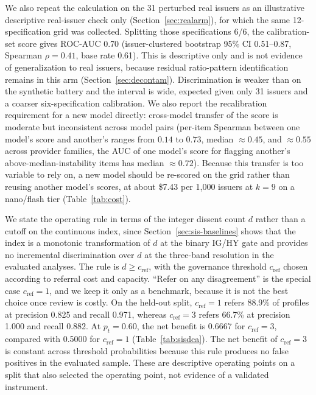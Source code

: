 \documentclass[a4paper,fleqn]{cas-sc}
\begin{document}
We also repeat the calculation on the 31 perturbed real issuers as an illustrative descriptive real-issuer check only (Section~\ref{sec:realarm}), for which the same 12-specification
grid was collected. Splitting those specifications 6/6, the calibration-set score gives ROC-AUC 0.70 (issuer-clustered bootstrap 95\% CI 0.51--0.87, Spearman $\rho=0.41$, base rate 0.61). This is descriptive only and is not evidence of generalization to real issuers, because residual ratio-pattern identification remains in this arm (Section~\ref{sec:decontam}). Discrimination is weaker than on the synthetic battery
and the interval is wide, expected given only 31 issuers and a coarser six-specification
calibration. 
 We also
report the recalibration requirement for a new model directly: cross-model transfer of the score is
moderate but inconsistent across model pairs (per-item Spearman between one model's score and another's
ranges from $0.14$ to $0.73$, median $\approx0.45$, and $\approx0.55$ across provider families, the AUC of
one model's score for flagging another's above-median-instability items has median $\approx0.72$). Because
this transfer is too variable to rely on, a new model should be re-scored on the grid rather than reusing
another model's scores, at about \$7.43 per 1{,}000 issuers at $k=9$ on a
nano/flash tier (Table~\ref{tab:cost}).

We state the operating rule in terms of the integer dissent count $d$ rather than a cutoff on the
continuous index, since Section~\ref{sec:sis-baselines} shows that the index is a monotonic transformation of $d$ at the binary IG/HY gate and provides no incremental discrimination over $d$ at the three-band resolution in the evaluated analyses. The rule is $d\ge c_{\mathrm{ref}}$, with the governance threshold $c_{\mathrm{ref}}$ chosen
according to referral cost and capacity. ``Refer on any disagreement'' is the special case $c_{\mathrm{ref}}=1$,
and we keep it only as a benchmark, because it is not the best choice once review is costly. On the held-out split, $c_{\mathrm{ref}}=1$ refers 88.9\% of profiles at precision 0.825 and recall 0.971, whereas $c_{\mathrm{ref}}=3$ refers 66.7\% at precision 1.000 and recall 0.882. At $p_t=0.60$, the net benefit is 0.6667 for $c_{\mathrm{ref}}=3$, compared with 0.5000 for $c_{\mathrm{ref}}=1$ (Table~\ref{tab:sisdca}). The net benefit of $c_{\mathrm{ref}}=3$ is constant across threshold probabilities because this rule produces no false positives in the evaluated sample. These are
descriptive operating points on a split that also selected the operating point, not evidence of a
validated instrument.
\end{document}
